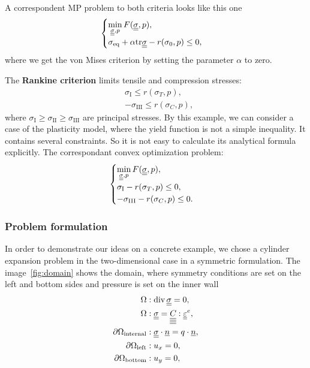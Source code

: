 \documentclass[12pt]{article}
\begin{document}
A correspondent MP problem to both criteria looks like this one
\begin{equation*}
    \begin{cases}
        \min\limits_{\underline{\underline{\sigma}}, p} F(\underline{\underline{\sigma}}, p), \\
        \sigma_\text{eq} + \alpha\mathrm{tr}\underline{\underline{\sigma}} - r(\sigma_0, p) \leq 0,
    \end{cases}
\end{equation*}
where we get the von Mises criterion by setting the parameter $\alpha$ to zero. 

The \textbf{Rankine criterion} limits tensile and compression stresses:
\begin{align*}
    & \sigma_\text{I} \leq r(\sigma_T, p), \\
    & -\sigma_\text{III} \leq r(\sigma_C, p),
\end{align*}
where $\sigma_\text{I} \geq \sigma_\text{II} \geq \sigma_\text{III}$ are principal stresses. By this example, we can consider a case of the plasticity model, where the yield function is not a simple inequality. It contains several constraints. So it is not easy to calculate its analytical formula explicitly. The correspondant convex optimization problem:
\begin{equation*}
    \begin{cases}
        \min\limits_{\underline{\underline{\sigma}}, p} F(\underline{\underline{\sigma}}, p), \\
        \sigma_\text{I} - r(\sigma_T, p) \leq 0, \\
        -\sigma_\text{III} - r(\sigma_C, p) \leq 0.    
    \end{cases}
\end{equation*}

\subsubsection{Problem formulation}
\label{sec:theory:problem_formulation}

In order to demonstrate our ideas on a concrete example, we chose a cylinder expansion problem in the two-dimensional case in a symmetric formulation. The image~\ref{fig:domain} shows the domain, where symmetry conditions are set on the left and bottom sides and pressure is set on the inner wall
\begin{align}
    \Omega &: \operatorname{div} \underline{\underline{\sigma}} = 0 ,\label{eqn:cylinder_div}\\
    \Omega &: \underline{\underline{\sigma}} = \underline{\underline{\underline{\underline{C_{}}}}} : \underline{\underline{\varepsilon}}^e, \\
    \partial\Omega_\text{internal} &: \underline{\underline{\sigma}} \cdot \underline{n} = q \cdot \underline{n}, \\
    \partial\Omega_\text{left} &: u_x = 0, \\
    \partial\Omega_\text{bottom} &: u_y = 0, \label{eqn:cylinder_bc}
\end{align}
\end{document}
